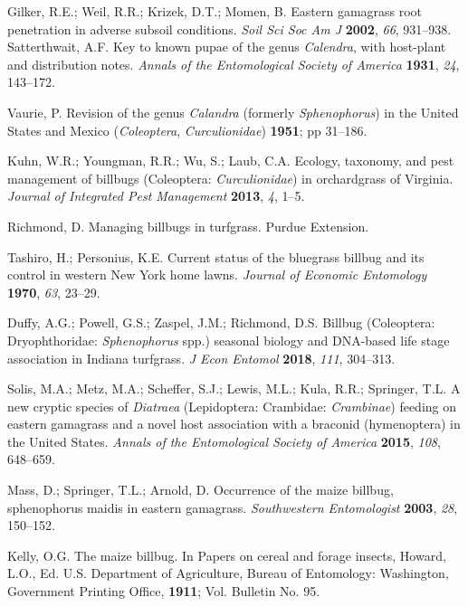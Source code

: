 \documentclass[agronomy,article,submit,moreauthors,pdftex,10pt,a4paper]{mdpi}
\theoremstyle{mdpi}
\newcounter{ex}
\newcounter{re}
\theoremstyle{mdpidefinition}
\begin{document}
\begin{thebibliography}{999}
Gilker, R.E.; Weil, R.R.; Krizek, D.T.; Momen, B. Eastern gamagrass root penetration in adverse subsoil conditions. \textit{Soil Sci Soc Am J} \textbf{2002}, \textit{66}, 931–938.
Satterthwait, A.F. Key to known pupae of the genus \textit{Calendra}, with host-plant and distribution notes. \textit{Annals of the Entomological Society of America }\textbf{1931}, \textit{24}, 143–172.

Vaurie, P. Revision of the genus \textit{Calandra} (formerly \textit{Sphenophorus}) in the United States and Mexico (\textit{Coleoptera}, \textit{Curculionidae}) \textbf{1951}; pp 31–186.

Kuhn, W.R.; Youngman, R.R.; Wu, S.; Laub, C.A. Ecology, taxonomy, and pest management of billbugs (Coleoptera: \textit{Curculionidae}) in orchardgrass of Virginia. \textit{Journal of Integrated Pest Management }\textbf{2013}, \textit{4}, 1–5.

Richmond, D. Managing billbugs in turfgrass. Purdue Extension.

Tashiro, H.; Personius, K.E. Current status of the bluegrass billbug and its control in western New York home lawns. \textit{Journal of Economic Entomology} \textbf{1970}, \textit{63}, 23–29.

Duffy, A.G.; Powell, G.S.; Zaspel, J.M.; Richmond, D.S. Billbug (Coleoptera: Dryophthoridae: \textit{Sphenophorus} spp.) seasonal biology and DNA-based life stage association in Indiana turfgrass. \textit{J Econ Entomol }\textbf{2018}, \textit{111}, 304–313.

Solis, M.A.; Metz, M.A.; Scheffer, S.J.; Lewis, M.L.; Kula, R.R.; Springer, T.L. A new cryptic species of \textit{Diatraea} (Lepidoptera: Crambidae: \textit{Crambinae}) feeding on eastern gamagrass and a novel host association with a braconid (hymenoptera) in the United States. \textit{Annals of the Entomological Society of America} \textbf{2015}, \textit{108}, 648–659.

Mass, D.; Springer, T.L.; Arnold, D. Occurrence of the maize billbug, sphenophorus maidis in eastern gamagrass. \textit{Southwestern Entomologist }\textbf{2003}, \textit{28}, 150–152.

Kelly, O.G. The maize billbug. In Papers on cereal and forage insects, Howard, L.O., Ed. U.S. Department of Agriculture, Bureau of Entomology: Washington, Government Printing Office, \textbf{1911}; Vol. Bulletin No. 95.


\end{thebibliography}
\end{document}
